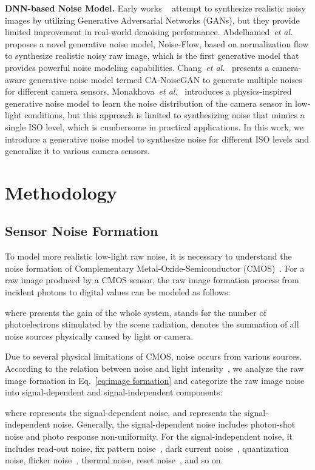 \documentclass[10pt,twocolumn,letterpaper]{article}
\def\etal{{\it{et al.}}}
\begin{document}
\textbf{DNN-based Noise Model.} Early works ~\cite{chen2018image, kim2019grdn} attempt to synthesize realistic noisy images by utilizing Generative Adversarial Networks (GANs), but they provide limited improvement in real-world denoising performance. Abdelhamed~\etal~\cite{abdelhamed2019noise} proposes a novel generative noise model, Noise-Flow, based on normalization flow to synthesize realistic noisy raw image, which is the first generative model that provides powerful noise modeling capabilities. Chang~\etal~\cite{chang2020learning} presents a camera-aware generative noise model termed CA-NoiseGAN to generate multiple noises for different camera sensors. Monakhova~\etal~\cite{monakhova2022dancing} introduces a physics-inspired generative noise model to learn the noise distribution of the camera sensor in low-light conditions, but this approach is limited to synthesizing noise that mimics a single ISO level, which is cumbersome in practical applications. In this work, we introduce a generative noise model to synthesize noise for different ISO levels and generalize it to various camera sensors.

\section{Methodology}
\label{method}
\subsection{Sensor Noise Formation}
To model more realistic low-light raw noise, it is necessary to understand the noise formation of Complementary Metal-Oxide-Semiconductor (CMOS)~\cite{cmosmarket}. For a raw image produced by a CMOS sensor, the raw image formation process from incident photons to digital values can be modeled as follows:

\noindent where  presents the gain of the whole system,  stands for the number of photoelectrons stimulated by the scene radiation,  denotes the summation of all noise sources physically caused by light or camera.

Due to several physical limitations of CMOS, noise occurs from various sources. According to the relation between noise and light intensity~\cite{healey1994radiometric,el2005cmos, farrell2008sensor}, we analyze the raw image formation in Eq.~\eqref{eq:image formation} and categorize the raw image noise into signal-dependent and signal-independent components:

\noindent where  represents the signal-dependent noise, and  represents the signal-independent noise. Generally, the signal-dependent noise includes photon-shot noise and photo response non-uniformity. For the signal-independent noise, it includes read-out noise, fix pattern noise~\cite{snoeij2006cmos}, dark current noise~\cite{baer2006model}, quantization noise, flicker noise~\cite{barnes1966statistical}, thermal noise, reset noise~\cite{konnik2014high}, and so on.
\end{document}
